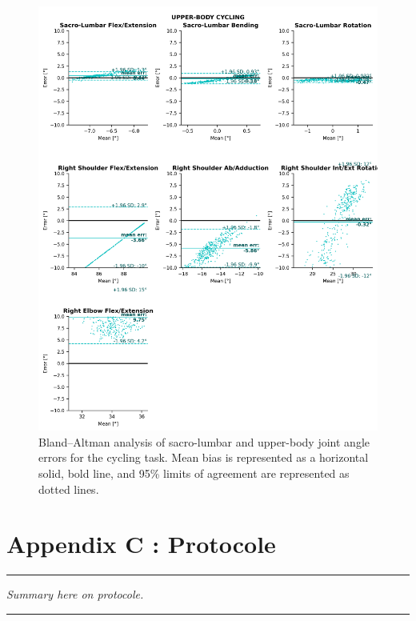 \begin{figure}[!ht]
	\centering
	\def\svgwidth{1\columnwidth}
	\fontsize{10pt}{10pt}\selectfont
	\includegraphics[height=\dimexpr\textheight-119pt]{"../Annexes/Figures/Fig_BlandBikeUp.png"}
	\caption{Bland–Altman analysis of sacro-lumbar and upper-body joint angle errors for the cycling task. Mean bias is represented as a horizontal solid, bold line, and 95\% limits of agreement are represented as dotted lines.}
	\label{fig_blandbikeup}
\end{figure}


\FloatBarrier
\chapter{Appendix C : Protocole}
\label{Ann:3}


\begin{center}
\rule{0.7\linewidth}{.5pt}
\begin{minipage}{0.7\linewidth}
\smallskip

\textit{Summary here on protocole.
}

\end{minipage}
\smallskip
\rule{0.7\linewidth}{.5pt}
\end{center}

